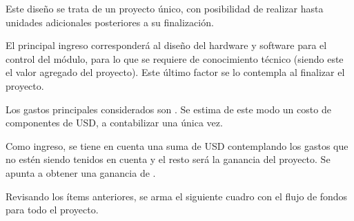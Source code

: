 

Este diseño se trata de un proyecto único, con posibilidad de realizar hasta \TBD unidades adicionales posteriores a su finalización.

El principal ingreso corresponderá al diseño del hardware y software para el control del módulo, para lo que se requiere de conocimiento técnico (siendo este el valor agregado del proyecto). Este último factor se lo contempla al finalizar el proyecto.


Los gastos principales considerados son \TBD. %
Se estima de este modo un costo de componentes de \TBD USD, a contabilizar una única vez.

Como ingreso, se tiene en cuenta una suma de \TBD USD contemplando los gastos que no estén siendo tenidos en cuenta y el resto será la ganancia del proyecto. Se apunta a obtener una ganancia de \TBD.


Revisando los ítems anteriores, se arma el siguiente cuadro con el flujo de fondos para todo el proyecto.
